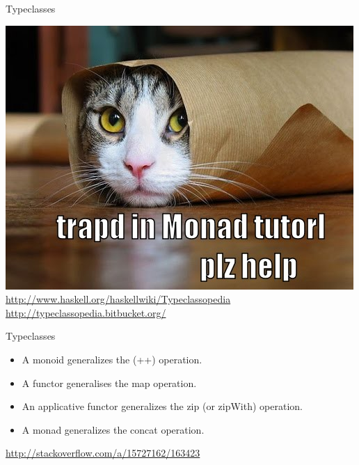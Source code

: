 \documentclass{beamer}
\begin{document}
\begin{frame}[fragile]{Typeclasses}
  \begin{center}
    \includegraphics[scale=0.3]{img/monad_tutorial}\newline
    {\large \url{http://www.haskell.org/haskellwiki/Typeclassopedia} }
    {\large \url{http://typeclassopedia.bitbucket.org/} }
  \end{center}
\end{frame}

\begin{frame}[fragile]{Typeclasses}
  \begin{center}
      \begin{itemize}
        \item A monoid generalizes the (++) operation.
        \item A functor generalises the map operation.
        \item An applicative functor generalizes the zip (or zipWith) operation.
        \item A monad generalizes the concat operation.
      \end{itemize}
      \url{http://stackoverflow.com/a/15727162/163423}
  \end{center}
\end{frame}
\end{document}

